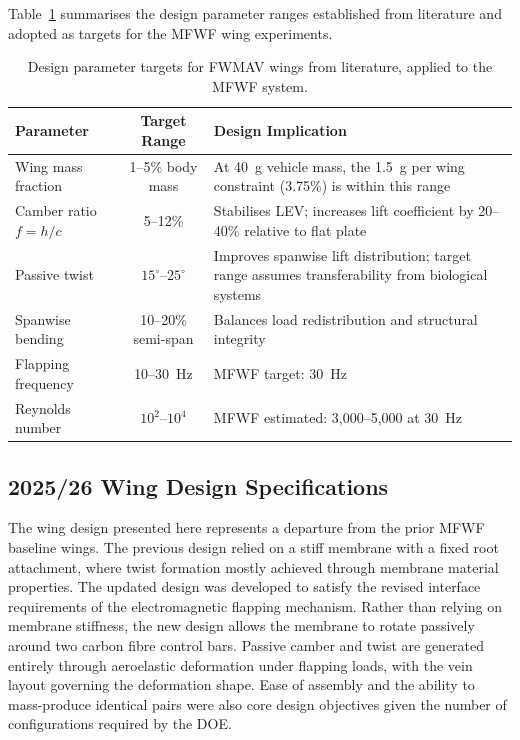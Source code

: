 Table~\ref{tab:lit_summary} summarises the design parameter ranges established from literature and adopted as targets for the MFWF wing experiments.

\begin{table}[H]
    \centering
    \begin{tabular}{||l|c|p{6cm}||}
        \hline
        \textbf{Parameter} & \textbf{Target Range} & \textbf{Design Implication}\\
        \hline\hline
        Wing mass fraction & 1--5\% body mass & At 40~g vehicle mass, the 1.5~g per wing constraint (3.75\%) is within this range \\
        \hline
        Camber ratio $f = h/c$ & 5--12\% & Stabilises LEV; increases lift coefficient by 20--40\% relative to flat plate \\
        \hline
        Passive twist & $15^\circ$--$25^\circ$ & Improves spanwise lift distribution; target range assumes transferability from biological systems \\
        \hline
        Spanwise bending & 10--20\% semi-span & Balances load redistribution and structural integrity \\
        \hline
        Flapping frequency & 10--30~Hz & MFWF target: 30~Hz \\
        \hline
        Reynolds number & $10^2$--$10^4$ & MFWF estimated: 3{,}000--5{,}000 at 30~Hz \\
        \hline
    \end{tabular}
    \caption{Design parameter targets for FWMAV wings from literature, applied to the MFWF system.}
    \label{tab:lit_summary}
\end{table}

\subsection{2025/26 Wing Design Specifications}

The wing design presented here represents a departure from the prior MFWF baseline wings. The previous design relied on a stiff membrane with a fixed root attachment, where twist formation mostly achieved through membrane material properties. The updated design was developed to satisfy the revised interface requirements of the electromagnetic flapping mechanism. Rather than relying on membrane stiffness, the new design allows the membrane to rotate passively around two carbon fibre control bars. Passive camber and twist are generated entirely through aeroelastic deformation under flapping loads, with the vein layout governing the deformation shape. Ease of assembly and the ability to mass-produce identical pairs were also core design objectives given the number of configurations required by the DOE.

